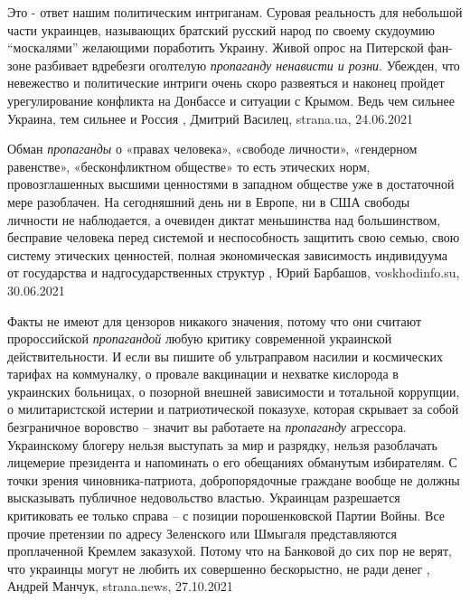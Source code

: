 Это - ответ нашим политическим интриганам.  Суровая реальность для небольшой
части украинцев, называющих братский русский народ по своему скудоумию
\enquote{москалями} желающими поработить Украину.  Живой опрос на Питерской фан-зоне
разбивает вдребезги оголтелую \emph{пропаганду ненависти и розни}.  Убежден, что
невежество и политические интриги очень скоро развеяться и наконец пройдет
урегулирование конфликта на Донбассе и ситуации с Крымом.  Ведь чем сильнее
Украина, тем сильнее и Россия
, Дмитрий Василец, strana.ua, 24.06.2021

Обман \emph{пропаганды} о «правах человека», «свободе личности», «гендерном
равенстве», «бесконфликтном обществе» то есть этических норм, провозглашенных
высшими ценностями в западном обществе уже в достаточной мере разоблачен. На
сегодняшний день ни в Европе, ни в США свободы личности не наблюдается, а
очевиден диктат меньшинства над большинством, бесправие человека перед системой
и неспособность защитить свою семью, свою систему этических ценностей, полная
экономическая зависимость индивидуума от государства и надгосударственных
структур
, 
Юрий Барбашов, voskhodinfo.su, 30.06.2021

Факты не имеют для цензоров никакого значения, потому что они считают
пророссийской \emph{пропагандой} любую критику современной украинской
действительности. И если вы пишите об ультраправом насилии и космических
тарифах на коммуналку, о провале вакцинации и нехватке кислорода в украинских
больницах, о позорной внешней зависимости и тотальной коррупции, о
милитаристской истерии и патриотической показухе, которая скрывает за собой
безграничное воровство – значит вы работаете на \emph{пропаганду} агрессора.
Украинскому блогеру нельзя выступать за мир и разрядку, нельзя разоблачать
лицемерие президента и напоминать о его обещаниях обманутым избирателям. С
точки зрения чиновника-патриота, добропорядочные граждане вообще не должны
высказывать публичное недовольство властью. Украинцам разрешается критиковать
ее только справа – с позиции порошенковской Партии Войны. Все прочие претензии
по адресу Зеленского или Шмыгаля представляются проплаченной Кремлем заказухой.
Потому что на Банковой до сих пор не верят, что украинцы могут не любить их
совершенно бескорыстно, не ради денег
, 
Андрей Манчук, strana.news, 27.10.2021
